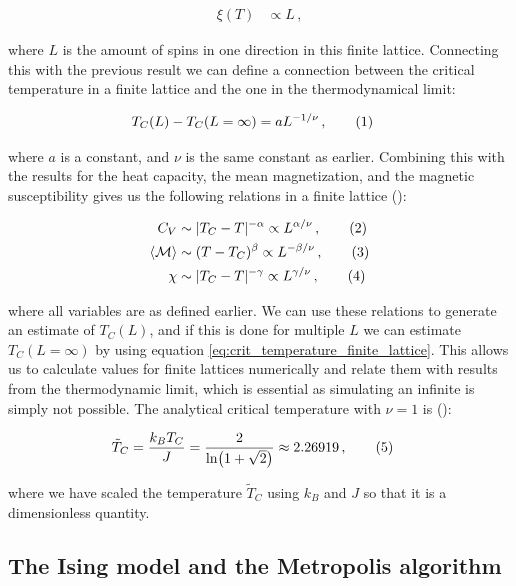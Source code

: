 \documentclass[reprint,english,notitlepage]{revtex4-1}  %
\newcommand\numberthis{\addtocounter{equation}{1}\tag{\theequation}}
\begin{document}
\begin{align*}
\xi (T) &\propto L \, ,
\end{align*}

where $L$ is the amount of spins in one direction in this finite lattice. Connecting this with the previous result we can define a connection between the critical temperature in a finite lattice and the one in the thermodynamical limit:

\begin{align*}
T_C(L) - T_C(L= \infty) &= aL^{-1/\nu} \, , \numberthis \label{eq:crit_temperature_finite_lattice} 
\end{align*}

where $a$ is a constant, and $\nu$ is the same constant as earlier. Combining this with the results for the heat capacity, the mean magnetization, and the magnetic susceptibility gives us the following relations in a finite lattice (\citep[p.78]{landau_binder_2014}):

\begin{align*}
C_V &\sim |T_C - T |^{-\alpha} \propto  L^{\alpha/\nu} \, , \numberthis \label{eq:finite_lattice_heat_capacity} \\
\langle \mathcal M \rangle &\sim (T-T_C)^\beta \propto L^{-\beta /\nu} \, , \numberthis \label{eq:finite_lattice_magnetization_per_spin} \\
\chi &\sim |T_C - T|^{-\gamma} \propto L^{\gamma/\nu} \, , \numberthis \label{eq:finite_lattice_susceptibility}
\end{align*}

where all variables are as defined earlier. We can use these relations to generate an estimate of $T_C(L)$, and if this is done for multiple $L$ we can estimate $T_C(L=\infty)$ by using equation \eqref{eq:crit_temperature_finite_lattice}. This allows us to calculate values for finite lattices numerically and relate them with results from the thermodynamic limit, which is essential as simulating an infinite is simply not possible. The analytical critical temperature with $\nu=1$ is (\citep{L.Onsager1944}):

\begin{align*}
\tilde{T}_C &= \frac{k_B T_C}{J} = \frac{2}{\ln(1 + \sqrt{2})} \approx 2.26919 \, , \numberthis \label{eq:crit_temperature_analytical}
\end{align*}

where we have scaled the temperature $\tilde{T}_C$ using $k_B$ and $J$ so that it is a dimensionless quantity.


\subsection{The Ising model and the Metropolis algorithm} \label{sec:II:b}
\end{document}
